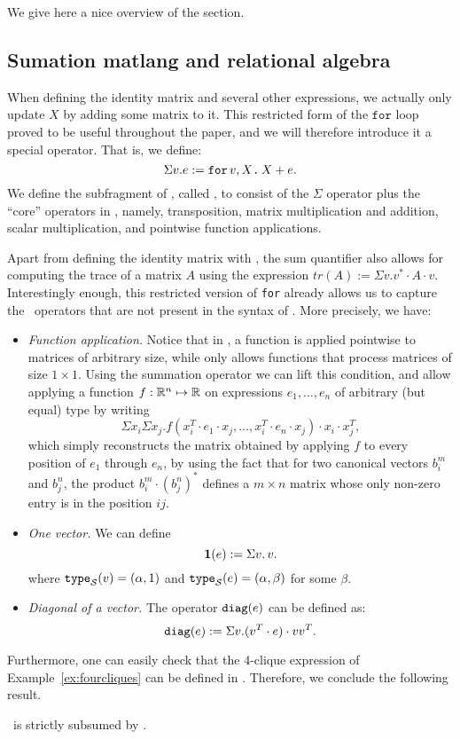 
We give here a nice overview of the section.

\newcommand{\hprod}{\circ}

\subsection{Sumation matlang and relational algebra}

When defining the identity matrix and several other expressions, we actually only update $X$ by adding some matrix to it. This restricted form of the $\texttt{for}$ loop proved to be useful throughout the paper, and we will therefore introduce it a special operator. That is, we define:
$$\Sigma v. e := \texttt{for}\, v,X \texttt{.}\, X + e.$$
We define the subfragment of \langfor, called \langsum, to consist of the $\Sigma$ operator plus the ``core'' operators in \lang, namely, transposition, matrix multiplication and addition, scalar multiplication, and pointwise function applications.

Apart from defining the identity matrix with \langsum, the sum quantifier also allows for computing the trace of a matrix $A$ using the expression $tr(A) := \Sigma v. v^*\cdot A \cdot v$. Interestingly enough, this restricted version of \texttt{for} already allows us to capture the \lang\ operators that are not present in the syntax of \langsum. More precisely, we have:
\begin{itemize}
\item {\em Function application.} Notice that in \lang, a function is applied pointwise to matrices of arbitrary size, while \langsum only allows functions that process matrices of size $1\times 1$. Using the summation operator we can lift this condition, and allow applying a function $f:\mathbb{\mathbb{R}}^n \mapsto \mathbb{\mathbb{R}}$ on expressions $e_1,\ldots ,e_n$ of arbitrary (but equal) type by writing 
$$\Sigma x_i \Sigma x_j. f(x_i^T\cdot e_1\cdot x_j, \ldots ,x_i^T\cdot e_n\cdot x_j) \cdot x_i\cdot x_j^T,$$
which simply reconstructs the matrix obtained by applying $f$ to every position of $e_1$ through $e_n$, by using the fact that for two canonical vectors $b_i^m$ and $b_j^n$, the product $b_i^m \cdot (b_j^n)^*$ defines a $m\times n$ matrix whose only non-zero entry is in the position $ij$.
\item {\em One vector.} We can define $$\mathbf{1}(e) := \Sigma v.\, v.$$ where $\texttt{type}_{\mathcal{S}}(v) = (\alpha, 1)$ and $\texttt{type}_{\mathcal{S}}(e) = (\alpha, \beta)$ for some $\beta$. 
\item {\em Diagonal of a vector.} The operator $\texttt{diag}(e)$ can be defined as:
$$\texttt{diag}(e) := \Sigma v. (v^T\cdot e) \cdot vv^T.$$
\end{itemize}
Furthermore, one can easily check that the 4-clique expression of Example~\ref{ex:fourcliques} can be defined in \langsum. Therefore, we conclude the following result. 
\begin{corollary}
\lang\ is strictly subsumed by \langsum.
\end{corollary}

